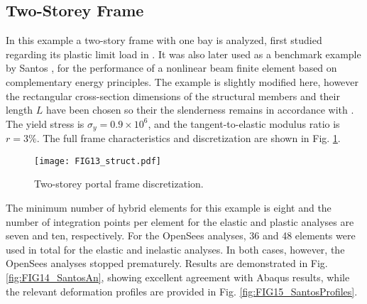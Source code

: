 \begin{figure*}[h]
	\centering
	\qquad
	\caption{Deformation profiles for Lee's frame with fixed supports.}%
	\label{fig:FIG12_LeesFixedProfiles}%
\end{figure*}

\clearpage
\begin{figure*}[t]
	\centering
	\qquad
	\caption{Geometrically nonlinear analyses of Lee's frame with fixed
		supports.}%
	\label{fig:FIG11_LeesFixed}%
\end{figure*}

\subsection{Two-Storey Frame}

In this example a two-story frame with one bay is analyzed, first studied
regarding its plastic limit load in \cite{horne}. It was also later used as a
benchmark example by Santos \cite{Santos1}, for the performance of a nonlinear
beam finite element based on complementary energy principles. The example
is slightly modified here, however the rectangular cross-section
dimensions of the structural members and their length $L$ have been
chosen so their the slenderness remains in accordance with
\cite{Santos1}. The yield stress is $\sigma_y=0.9\times 10^6$, and the
tangent-to-elastic modulus ratio is $r=3\%$. The full frame
characteristics and discretization are shown in Fig. 
\ref{fig:FIG13_santosStruct}.

\begin{figure}[t]
	\centering
	\texttt{[image: FIG13\_struct.pdf]}
	\caption{Two-storey portal frame discretization.}
	\label{fig:FIG13_santosStruct}
\end{figure}

The minimum number of hybrid elements for this example is eight and the number
of integration points per element for the elastic and plastic analyses are
seven and ten, respectively. For the OpenSees analyses, 36 and 48 elements
were used in total for the elastic and inelastic analyses. In both cases,
however, the OpenSees analyses stopped prematurely. Results are
demonstrated in Fig. \ref{fig:FIG14_SantosAn}, showing excellent agreement 
with
Abaqus results, while the relevant deformation profiles are
provided in Fig. \ref{fig:FIG15_SantosProfiles}.

